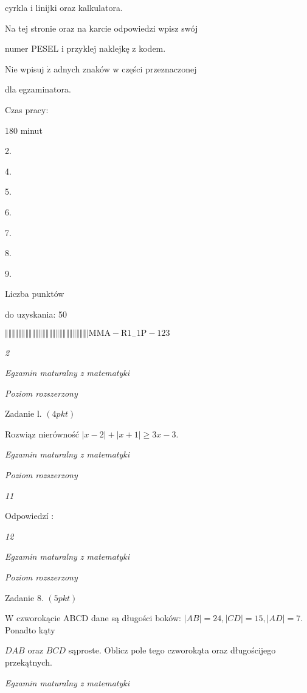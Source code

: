 \documentclass[a4paper,12pt]{article}
\begin{document}
cyrkla i linijki oraz kalkulatora.

Na tej stronie oraz na karcie odpowiedzi wpisz swój

numer PESEL i przyklej naklejkę z kodem.

Nie wpisuj $\dot{\mathrm{z}}$ adnych znaków w części przeznaczonej

dla egzaminatora.

Czas pracy:

180 minut

2.

4.

5.

6.

7.

8.

9.

Liczba punktów

do uzyskania: 50

$\Vert\Vert\Vert\Vert\Vert\Vert\Vert\Vert\Vert\Vert\Vert\Vert\Vert\Vert\Vert\Vert\Vert\Vert\Vert\Vert\Vert\Vert\Vert\Vert|  \mathrm{M}\mathrm{M}\mathrm{A}-\mathrm{R}1_{-}1\mathrm{P}-123$




{\it 2}

{\it Egzamin maturalny z matematyki}

{\it Poziom rozszerzony}

Zadanie l. $(4pkt)$

Rozwiąz nierówność $|x-2|+|x+1|\geq 3x-3.$





{\it Egzamin maturalny z matematyki}

{\it Poziom rozszerzony}

{\it 11}

Odpowiedzí :





{\it 12}

{\it Egzamin maturalny z matematyki}

{\it Poziom rozszerzony}

Zadanie 8. $(5pkt)$

$\mathrm{W}$ czworokącie ABCD dane są długości boków: $|AB|=24, |CD|=15, |AD|=7$. Ponadto kąty

$DAB$ oraz $BCD$ sąproste. Oblicz pole tego czworokąta oraz długościjego przekątnych.





{\it Egzamin maturalny z matematyki}
\end{document}
